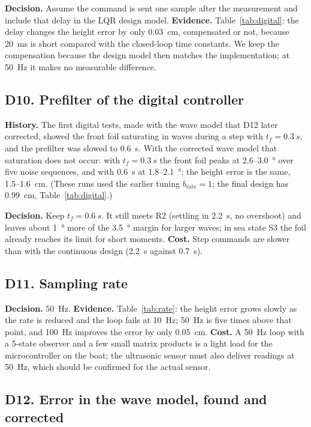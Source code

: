 \documentclass[11pt,a4paper]{article}
\begin{document}
\textbf{Decision.} Assume the command is sent one sample after the measurement
and include that delay in the LQR design model. \textbf{Evidence.}
Table~\ref{tab:digital}: the delay changes the height error by only
\SI{0.03}{cm}, compensated or not, because \SI{20}{ms} is short compared with the
closed-loop time constants. We keep the compensation because the design model
then matches the implementation; at \SI{50}{Hz} it makes no measurable
difference.

\subsection{D10. Prefilter of the digital controller}

\textbf{History.} The first digital tests, made with the wave model that D12
later corrected, showed the front foil saturating in waves during a step with
$t_f=\SI{0.3}{s}$, and the prefilter was slowed to \SI{0.6}{s}. With the corrected
wave model that saturation does not occur: with $t_f=\SI{0.3}{s}$ the front foil
peaks at 2.6--\SI{3.0}{\degree} over five noise sequences, and with
\SI{0.6}{s} at 1.8--\SI{2.1}{\degree}; the height error is the same,
1.5--\SI{1.6}{cm}. (These runs used the earlier tuning $b_{\mathrm{rate}}=1$; the
final design has \SI{0.99}{cm}, Table~\ref{tab:digital}.)

\textbf{Decision.} Keep $t_f=\SI{0.6}{s}$. It still meets R2 (settling in
\SI{2.2}{s}, no overshoot) and leaves about \SI{1}{\degree} more of the
\SI{3.5}{\degree} margin for larger waves; in sea state S3 the foil already
reaches its limit for short moments. \textbf{Cost.} Step commands are slower
than with the continuous design (\SI{2.2}{s} against \SI{0.7}{s}).

\subsection{D11. Sampling rate}

\textbf{Decision.} \SI{50}{Hz}. \textbf{Evidence.} Table~\ref{tab:rate}: the
height error grows slowly as the rate is reduced and the loop fails at
\SI{10}{Hz}; \SI{50}{Hz} is five times above that point, and \SI{100}{Hz} improves
the error by only \SI{0.05}{cm}. \textbf{Cost.} A \SI{50}{Hz} loop with a 5-state
observer and a few small matrix products is a light load for the
microcontroller on the boat; the ultrasonic sensor must also deliver
readings at \SI{50}{Hz}, which should be confirmed for the actual sensor.

\subsection{D12. Error in the wave model, found and corrected}
\end{document}
